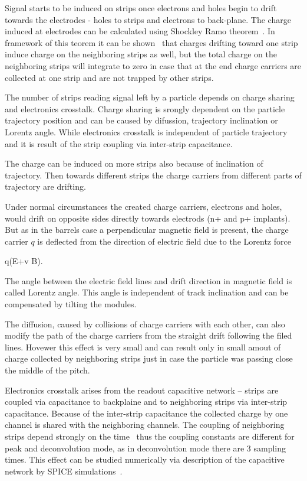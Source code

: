 Signal starts to be induced on strips once electrons and holes begin to drift towards the electrodes - holes to strips and electrons to back-plane. The charge induced at electrodes can be calculated using Shockley Ramo theorem~\cite{doi:10.1063/1.1710367,Ramo:1939vr}. In framework of this teorem it can be shown~\cite{Bloch:2007zza} that charges drifting toward one strip induce charge on the neighboring strips as well, but the total charge on the neighboring strips will integrate to zero in case that at the end charge carriers are collected at one strip and are not trapped by other strips.

The number of strips reading signal left by a particle depends on charge sharing and electronics crosstalk. Charge sharing is srongly dependent on the particle trajectory position and can be caused by difussion, trajectory inclination or Lorentz angle. While electronics crosstalk is independent of particle trajectory and it is result of the strip coupling via inter-strip capacitance. 

The charge can be induced on more strips also because of inclination of trajectory. Then towards different strips the charge carriers from different parts of trajectory are drifting.

Under normal circumstances the created charge carriers, electrons and holes, would drift on opposite sides directly towards electrods (n+ and p+ implants). But as in the barrels case a perpendicular magnetic field is present, the charge carrier $q$ is deflected from the direction of electric field due to the Lorentz force

{
    q(E+v \times B).
}

The angle between the electric field lines and drift direction in magnetic field is called Lorentz angle. This angle is independent of track inclination and can be compensated by tilting the modules.

The diffusion, caused by collisions of charge carriers with each other, can also modify the path of the charge carriers from the straight drift following the filed lines. Hovewer this effect is very small and can result only in small amout of charge collected by neighboring strips just in case the particle was passing close the middle of the pitch.


Electronics crosstalk arises from the readout capacitive network -- strips are coupled via capacitance to backplaine and to neighboring strips via inter-strip capacitance. Because of the inter-strip capacitance the collected charge by one channel is shared with the neighboring channels. The coupling of neighboring strips depend strongly on the time~\cite{Bloch:2007zza} thus the coupling constants are different for peak and deconvolution mode, as in deconvolution mode there are 3 sampling times. This effect can be studied numerically via description of the capacitive network by SPICE simulations~\cite{Barberis:1993ph}.



